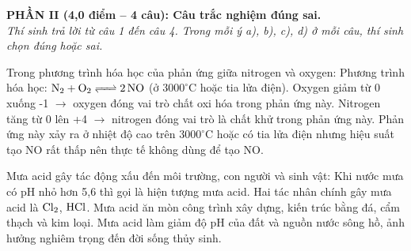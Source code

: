 \documentclass[12pt,a4paper]{article}
\begin{document}

\bigskip
\noindent
\textbf{PHẦN II (4,0 điểm -- 4 câu): Câu trắc nghiệm đúng sai.}\\
\textit{Thí sinh trả lời từ câu 1 đến câu 4. Trong mỗi ý a), b), c), d) ở mỗi câu, thí sinh chọn đúng hoặc sai.}

\begin{ex}
Trong phương trình hóa học của phản ứng giữa nitrogen và oxygen:
\choiceTF
{\True Phương trình hóa học: $\ce{N2 + O2 <=> 2NO}$ (ở $3000^\circ\text{C}$ hoặc tia lửa điện).}
{Oxygen giảm từ 0 xuống -1 $\rightarrow$ oxygen đóng vai trò chất oxi hóa trong phản ứng này.}
{Nitrogen tăng từ 0 lên +4 $\rightarrow$ nitrogen đóng vai trò là chất khử trong phản ứng này.}
{\True Phản ứng này xảy ra ở nhiệt độ cao trên $3000^\circ\text{C}$ hoặc có tia lửa điện nhưng hiệu suất tạo NO rất thấp nên thực tế không dùng để tạo NO.}
\end{ex}

\begin{ex}
Mưa acid gây tác động xấu đến môi trường, con người và sinh vật:
\choiceTF
{\True Khi nước mưa có pH nhỏ hơn 5,6 thì gọi là hiện tượng mưa acid.}
{Hai tác nhân chính gây mưa acid là $\ce{Cl2}$, $\ce{HCl}$.}
{\True Mưa acid ăn mòn công trình xây dựng, kiến trúc bằng đá, cẩm thạch và kim loại.}
{\True Mưa acid làm giảm độ pH của đất và nguồn nước sông hồ, ảnh hưởng nghiêm trọng đến đời sống thủy sinh.}
\end{ex}
\end{document}
